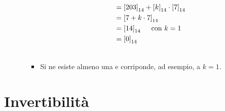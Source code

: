 \documentclass[10pt]{article}
\begin{document}
\begin{itemize}
\begin{enumerate}
\begin{itemize}
\begin{equation}
\begin{split}
	&= \left[203\right]_{14} + \left[k\right]_{14} \cdot \left[7\right]_{14} \\
	&= \left[7 + k \cdot 7\right]_{14} \\
	&= \left[14\right]_{14} \textrm{ \quad con } k=1 \\
	&= \left[0\right]_{14} \\
	\notag
	\end{split}
	\end{equation}
	\item
	Si ne esiste almeno una e corriponde, ad esempio, a $k=1$.
	\end{itemize}
	\end{enumerate}
	\end{itemize}
	
	\newpage
	
  \section{Invertibilità}
\end{document}
